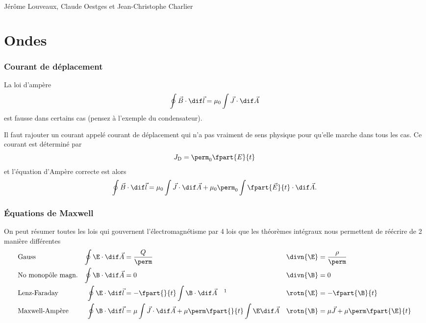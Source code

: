 

\usepackage{pgfplots}
\usepackage{caption}
\usepackage{subcaption}

{Jérôme Louveaux, Claude Oestges et Jean-Christophe Charlier}

\part{Ondes}
\section{Courant de déplacement}
La loi d'ampère
\[ \oint \vec{B} \cdot \dif \vec{l} = \mu_0 \int \vec{J} \cdot \dif \vec{A} \]
est fausse dans certains cas (pensez à l'exemple du condensateur).

Il faut rajouter un courant appelé courant de déplacement qui n'a pas
vraiment de sens physique pour qu'elle marche dans tous les cas.
Ce courant est déterminé par
\[ J_\mathrm{D} = \perm_0\fpart{E}{t} \]
et l'équation d'Ampère correcte est alors
\[ \oint \vec{B} \cdot \dif \vec{l} =
\mu_0 \int \vec{J} \cdot \dif \vec{A} +
\mu_0\perm_0 \int\fpart{\vec{E}}{t} \cdot \dif \vec{A}. \]

\section{Équations de Maxwell}
On peut résumer toutes les lois qui gouvernent l'électromagnétisme
par 4 lois que les théorèmes intégraux nous permettent de réécrire
de 2 manière différentes
\begin{align*}
  &\text{Gauss} & \oint \E \cdot \dif \vec{A} & = \frac{Q}{\perm}
  & \divn{\E} & = \frac{\rho}{\perm}\\
  &\text{No monopôle magn.} & \oint \B \cdot \dif \vec{A} & = 0
  & \divn{\B} & = 0\\
  &\text{Lenz-Faraday} & \oint \E \cdot \dif \vec{l} & = -\fpart{}{t} \int \B \cdot \dif \vec{A}~~~\text{\footnotemark}
  & \rotn{\E} & = -\fpart{\B}{t}\\
  &\text{Maxwell-Ampère} & \oint \B \cdot \dif \vec{l} & = \mu \int \vec{J} \cdot \dif \vec{A}
  + \mu\perm\fpart{}{t} \int \E \dif \vec{A}
  & \rotn{\B} & = \mu\vec{J} + \mu\perm\fpart{\E}{t}
\end{align*}

